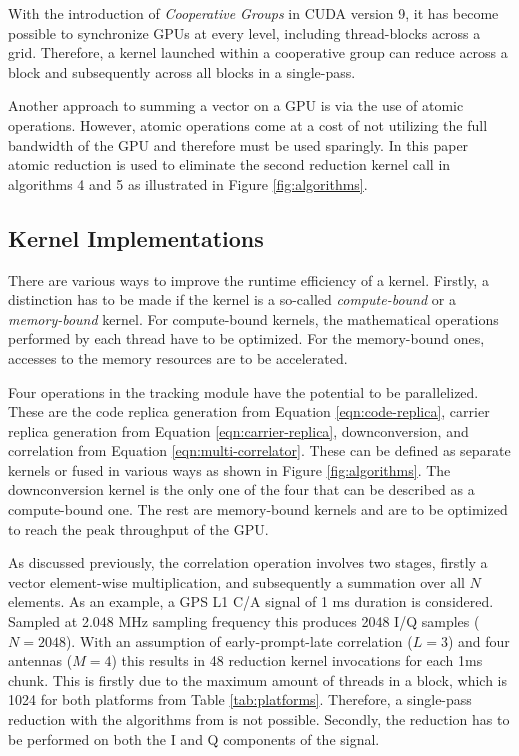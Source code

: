 \documentclass{juliacon}
\begin{document}
With the introduction of \emph{Cooperative Groups} in CUDA version 9, it has become possible to synchronize GPUs at every level, including thread-blocks across a grid. Therefore, a kernel launched within a cooperative group can reduce across a block and subsequently across all blocks in a single-pass.

Another approach to summing a vector on a GPU is via the use of atomic operations. However, atomic operations come at a cost of not utilizing the full bandwidth of the GPU and therefore must be used sparingly. In this paper atomic reduction is used to eliminate the second reduction kernel call in algorithms 4 and 5 as illustrated in Figure \ref{fig:algorithms}.

\subsection*{Kernel Implementations}
There are various ways to improve the runtime efficiency of a kernel. Firstly, a distinction has to be made if the kernel is a so-called \emph{compute-bound} or a \emph{memory-bound} kernel. For compute-bound kernels, the mathematical operations performed by each thread have to be optimized. For the memory-bound ones, accesses to the memory resources are to be accelerated. 

Four operations in the tracking module have the potential to be parallelized. These are the code replica generation from Equation \ref{eqn:code-replica}, carrier replica generation from Equation \ref{eqn:carrier-replica}, downconversion, and correlation from  Equation \ref{eqn:multi-correlator}. These can be defined as separate kernels or fused in various ways as shown in Figure \ref{fig:algorithms}. The downconversion kernel is the only one of the four that can be described as a compute-bound one. The rest are memory-bound kernels and are to be optimized to reach the peak throughput of the GPU.

As discussed previously, the correlation operation involves two stages, firstly a vector element-wise multiplication, and subsequently a summation over all $N$ elements. As an example, a GPS L1 C/A signal of 1 ms duration is considered. Sampled at 2.048 MHz sampling frequency this produces 2048 I/Q samples ($N=2048
$). With an assumption of early-prompt-late correlation ($L = 3$) and four antennas ($M = 4$) this results in 48 reduction kernel invocations for each 1ms chunk. This is firstly due to the maximum amount of threads in a block, which is 1024 for both platforms from Table \ref{tab:platforms}. Therefore, a single-pass reduction with the algorithms from \cite{Harris2007} is not possible. Secondly, the reduction has to be performed on both the I and Q components of the signal.
\end{document}

